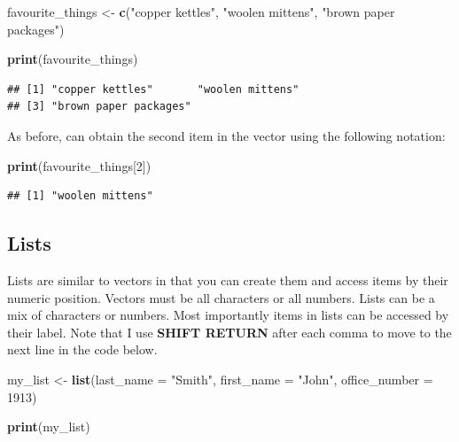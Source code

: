\documentclass[
]{krantz}
\makeatletter
\newenvironment{Shaded}{\begin{snugshade}}{\end{snugshade}}
\newcommand{\DataTypeTok}[1]{\textcolor[rgb]{0.27,0.27,0.27}{#1}}
\newcommand{\DecValTok}[1]{\textcolor[rgb]{0.06,0.06,0.06}{#1}}
\newcommand{\KeywordTok}[1]{\textcolor[rgb]{0.27,0.27,0.27}{\textbf{#1}}}
\newcommand{\NormalTok}[1]{#1}
\newcommand{\StringTok}[1]{\textcolor[rgb]{0.5,0.5,0.5}{#1}}
\newenvironment{kframe}{%
\medskip{}
\setlength{\fboxsep}{.8em}
 \def\at@end@of@kframe{}%
 \ifinner\ifhmode%
  \def\at@end@of@kframe{\end{minipage}}%
  \begin{minipage}{\columnwidth}%
 \fi\fi%
 \def\FrameCommand##1{\hskip\@totalleftmargin \hskip-\fboxsep
 \colorbox{shadecolor}{##1}\hskip-\fboxsep
     \hskip-\linewidth \hskip-\@totalleftmargin \hskip\columnwidth}%
 \MakeFramed {\advance\hsize-\width
   \@totalleftmargin\z@ \linewidth\hsize
   \@setminipage}}%
 {\par\unskip\endMakeFramed%
 \at@end@of@kframe}
\renewenvironment{Shaded}{\begin{kframe}}{\end{kframe}}
\makeatother
\begin{document}
\begin{Shaded}
\begin{Highlighting}[]
\NormalTok{favourite_things <-}\StringTok{ }\KeywordTok{c}\NormalTok{(}\StringTok{"copper kettles"}\NormalTok{,}
                      \StringTok{"woolen mittens"}\NormalTok{,}
                      \StringTok{"brown paper packages"}\NormalTok{)}
\end{Highlighting}
\end{Shaded}

\begin{Shaded}
\begin{Highlighting}[]
\KeywordTok{print}\NormalTok{(favourite_things)}
\end{Highlighting}
\end{Shaded}

\begin{verbatim}
## [1] "copper kettles"       "woolen mittens"      
## [3] "brown paper packages"
\end{verbatim}

As before, can obtain the second item in the vector using the following notation:

\begin{Shaded}
\begin{Highlighting}[]
\KeywordTok{print}\NormalTok{(favourite_things[}\DecValTok{2}\NormalTok{])}
\end{Highlighting}
\end{Shaded}

\begin{verbatim}
## [1] "woolen mittens"
\end{verbatim}

\hypertarget{lists}{%
\subsection{Lists}\label{lists}}

Lists are similar to vectors in that you can create them and access items by their numeric position. Vectors must be all characters or all numbers. Lists can be a mix of characters or numbers. Most importantly items in lists can be accessed by their label. Note that I use \textbf{SHIFT RETURN} after each comma to move to the next line in the code below.

\begin{Shaded}
\begin{Highlighting}[]
\NormalTok{my_list <-}\StringTok{ }\KeywordTok{list}\NormalTok{(}\DataTypeTok{last_name =} \StringTok{"Smith"}\NormalTok{,}
                \DataTypeTok{first_name =} \StringTok{"John"}\NormalTok{,}
                \DataTypeTok{office_number =} \DecValTok{1913}\NormalTok{)}

\KeywordTok{print}\NormalTok{(my_list)}
\end{Highlighting}
\end{Shaded}
\end{document}
